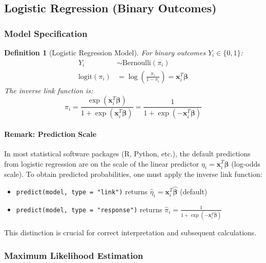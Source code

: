 \documentclass{article}
\newtheorem{definition}{Definition}
\begin{document}
\subsection{Logistic Regression (Binary Outcomes)}

\subsubsection{Model Specification}

\begin{definition}[Logistic Regression Model]
For binary outcomes $Y_i \in \{0, 1\}$:
\begin{align}
Y_i &\sim \text{Bernoulli}(\pi_i) \\
\text{logit}(\pi_i) &= \log\left(\frac{\pi_i}{1-\pi_i}\right) = \mathbf{x}_i^T\boldsymbol{\beta}
\end{align}
The inverse link function is:
\begin{equation}
\pi_i = \frac{\exp(\mathbf{x}_i^T\boldsymbol{\beta})}{1 + \exp(\mathbf{x}_i^T\boldsymbol{\beta})} = \frac{1}{1 + \exp(-\mathbf{x}_i^T\boldsymbol{\beta})}
\end{equation}
\end{definition}

\paragraph{Remark: Prediction Scale}
In most statistical software packages (R, Python, etc.), the default predictions from logistic regression are on the scale of the linear predictor $\eta_i = \mathbf{x}_i^T\boldsymbol{\beta}$ (log-odds scale). To obtain predicted probabilities, one must apply the inverse link function:
\begin{itemize}
    \item \texttt{predict(model, type = "link")} returns $\hat{\eta}_i = \mathbf{x}_i^T\hat{\boldsymbol{\beta}}$ (default)
    \item \texttt{predict(model, type = "response")} returns $\hat{\pi}_i = \frac{1}{1 + \exp(-\mathbf{x}_i^T\hat{\boldsymbol{\beta}})}$
\end{itemize}
This distinction is crucial for correct interpretation and subsequent calculations.



\subsubsection{Maximum Likelihood Estimation}
\end{document}
